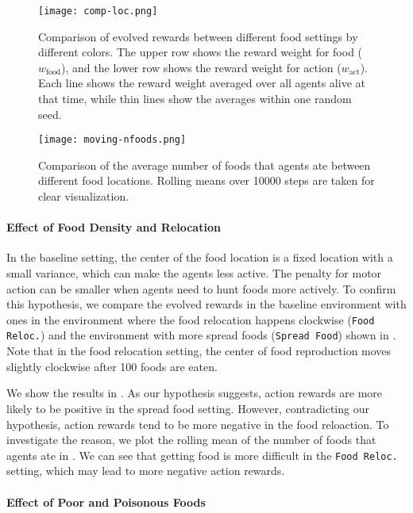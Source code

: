 \begin{figure}[ht]
  \centering
  \texttt{[image: comp-loc.png]}
  \caption{
    Comparison of evolved rewards between different food settings by different colors.
    The upper row shows the reward weight for food ($w_{\mathrm{food}}$), and the lower row shows the reward weight for action ($w_{\mathrm{act}}$).
    Each line shows the reward weight averaged over all agents alive at that time, while thin lines show the averages within one random seed.
  }\label{figure:result-foodloc}
\end{figure}

\begin{figure}[!htb]
  \centering
  \texttt{[image: moving-nfoods.png]}
  \caption{
    Comparison of the average number of foods that agents ate between different food locations.
    Rolling means over 10000 steps are taken for clear visualization.
  }\label{figure:result-nfood}
\end{figure}

\paragraph{Effect of Food Density and Relocation}
In the baseline setting, the center of the food location is a fixed location with a small variance, which can make the agents less active. The penalty for motor action can be smaller when agents need to hunt foods more actively. To confirm this hypothesis, we compare the evolved rewards in the baseline environment with ones in the environment where the food relocation happens clockwise (\texttt{Food Reloc.}) and the environment with more spread foods (\texttt{Spread Food}) shown in . Note that in the food relocation setting, the center of food reproduction moves slightly clockwise after 100 foods are eaten.

We show the results in . As our hypothesis suggests, action rewards are more likely to be positive in the spread food setting. However, contradicting our hypothesis, action rewards tend to be more negative in the food reloaction. To investigate the reason, we plot the rolling mean of the number of foods that agents ate in . We can see that getting food is more difficult in the \texttt{Food Reloc.} setting, which may lead to more negative action rewards.

\paragraph{Effect of Poor and Poisonous Foods}

